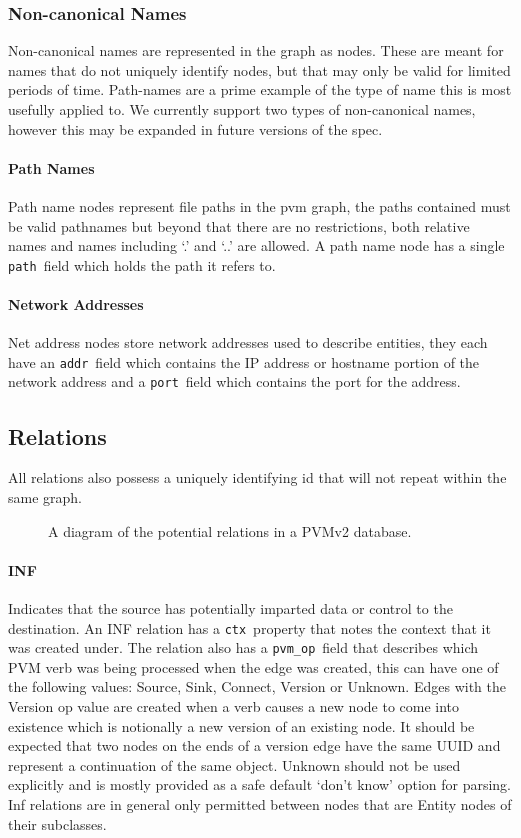 \documentclass[12pt,twoside,a4paper]{article}
\newcommand{\field}[1]{\texttt{#1}}
\newcommand{\para}[1]{\paragraph{#1\\}}
\begin{document}
\subsubsection{Non-canonical Names}
\label{sec:gs:node:name}
Non-canonical names are represented in the graph as nodes. These are meant for names that do not uniquely identify nodes, but that may only be valid for limited periods of time. Path-names are a prime example of the type of name this is most usefully applied to. We currently support two types of non-canonical names, however this may be expanded in future versions of the spec.

\para{Path Names}
\label{sec:gs:node:name:path}
Path name nodes represent file paths in the pvm graph, the paths contained must be valid pathnames but beyond that there are no restrictions, both relative names and names including `.' and `..' are allowed. A path name node has a single \field{path}~field which holds the path it refers to.

\para{Network Addresses}
\label{sec:gs:node:name:net}
Net address nodes store network addresses used to describe entities, they each have an \field{addr}~field which contains the IP address or hostname portion of the network address and a \field{port}~field which contains the port for the address.

\subsection{Relations}
\label{sec:gs:rel}
All relations also possess a uniquely identifying id that will not repeat within the same graph.

\begin{figure}[h]
\centering

\caption{A diagram of the potential relations in a PVMv2 database.}
\label{fig:rels}
\end{figure}

\para{INF}
\label{sec:gs:rel:inf}
Indicates that the source has potentially imparted data or control to the destination. An INF relation has a \field{ctx}~property that notes the context that it was created under. The relation also has a \field{pvm\_op}~field that describes which PVM verb was being processed when the edge was created, this can have one of the following values: Source, Sink, Connect, Version or Unknown. Edges with the Version op value are created when a verb causes a new node to come into existence which is notionally a new version of an existing node. It should be expected that two nodes on the ends of a version edge have the same UUID and represent a continuation of the same object. Unknown should not be used explicitly and is mostly provided as a safe default `don't know' option for parsing. Inf relations are in general only permitted between nodes that are Entity nodes of their subclasses.
\end{document}
